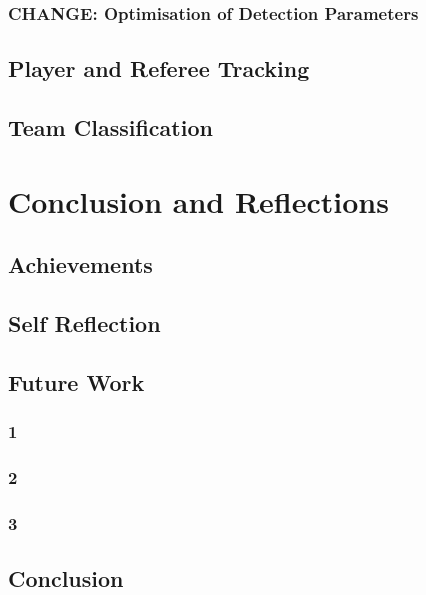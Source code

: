 \documentclass[12pt, letterpaper]{article}
\begin{document}
\subsubsection{\textbf{CHANGE}: Optimisation of Detection Parameters}
\subsection{Player and Referee Tracking}
\subsection{Team Classification}
\newpage

\section{Conclusion and Reflections}

\subsection{Achievements}
\subsection{Self Reflection}
\subsection{Future Work}
\subsubsection{1}
\subsubsection{2}
\subsubsection{3}
\subsection{Conclusion}
\newpage


\end{document}
